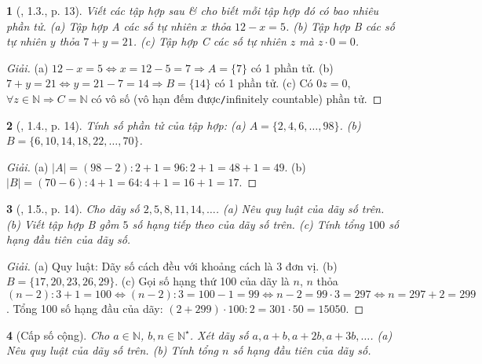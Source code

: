 \documentclass{article}
\newtheorem{baitoan}{}
\begin{document}
\begin{baitoan}[\cite{Binh_boi_duong_Toan_6_tap_1}, 1.3., p. 13]
	Viết các tập hợp sau \& cho biết mỗi tập hợp đó có bao nhiêu phần tử. (a) Tập hợp A các số tự nhiên $x$ thỏa $12 - x = 5$. (b) Tập hợp B các số tự nhiên $y$ thỏa $7 + y = 21$. (c) Tập hợp C các số tự nhiên $z$ mà $z\cdot0 = 0$.
\end{baitoan}

\begin{proof}[Giải]
	(a) $12 - x = 5\Leftrightarrow x = 12 - 5 = 7\Rightarrow A = \{7\}$ có 1 phần tử. (b) $7 + y = 21\Leftrightarrow y = 21 - 7 = 14\Rightarrow B = \{14\}$ có 1 phần tử. (c) Có $0z = 0$, $\forall z\in\mathbb{N}\Rightarrow C = \mathbb{N}$ có vô số (vô hạn đếm được{\tt/}infinitely countable) phần tử.
\end{proof}

\begin{baitoan}[\cite{Binh_boi_duong_Toan_6_tap_1}, 1.4., p. 14]
	Tính số phần tử của tập hợp: (a) $A = \{2,4,6,\ldots,98\}$. (b) $B = \{6,10,14,18,22,\ldots,70\}$.
\end{baitoan}

\begin{proof}[Giải]
	(a) $|A| = (98 - 2):2 + 1 = 96:2 + 1 = 48 + 1 = 49$. (b) $|B| = (70 - 6):4 + 1 = 64:4 + 1 = 16 + 1 = 17$.
\end{proof}

\begin{baitoan}[\cite{Binh_boi_duong_Toan_6_tap_1}, 1.5., p. 14]
	Cho dãy số $2,5,8,11,14,\ldots$. (a) Nêu quy luật của dãy số trên. (b) Viết tập hợp B gồm $5$ số hạng tiếp theo của dãy số trên. (c) Tính tổng $100$ số hạng đầu tiên của dãy số.
\end{baitoan}

\begin{proof}[Giải]
	(a) Quy luật: Dãy số cách đều với khoảng cách là 3 đơn vị. (b) $B = \{17,20,23,26,29\}$. (c) Gọi số hạng thứ 100 của dãy là $n$, $n$ thỏa $(n - 2):3 + 1 = 100\Leftrightarrow(n - 2):3 = 100 - 1 = 99\Leftrightarrow n - 2 = 99\cdot3 = 297\Leftrightarrow n = 297 + 2 = 299$. Tổng 100 số hạng đầu của dãy: $(2 + 299)\cdot100:2 = 301\cdot50 = 15050$.
\end{proof}

\begin{baitoan}[Cấp số cộng]
	Cho $a\in\mathbb{N}$, $b,n\in\mathbb{N}^\star$. Xét dãy số $a,a + b,a + 2b,a + 3b,\ldots$. (a) Nêu quy luật của dãy số trên. (b) Tính tổng $n$ số hạng đầu tiên của dãy số.
\end{baitoan}
	
\end{document}
